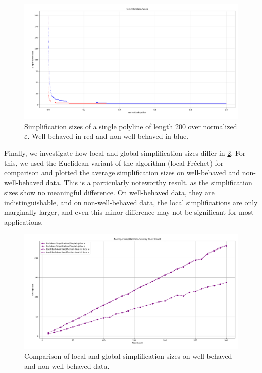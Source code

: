 \begin{figure}[b]
  \centering
	\includegraphics[scale=0.4]{./figures/vary_e200.png}
  \caption{Simplification sizes of a single polyline of length 200 over normalized \(\varepsilon\). Well-behaved in red and non-well-behaved in blue.}
  \label{fig:vary_e200}
\end{figure}

Finally, we investigate how local and global simplification sizes differ in \cref{fig:res-local-global}. For this, we used the Euclidean variant of the \citeauthor{computational_geometric_methods_for_polygonal_approximations_of_a_curve} algorithm (local Fréchet) for comparison and plotted the average simplification sizes on well-behaved and non-well-behaved data. This is a particularly noteworthy result, as the simplification sizes show no meaningful difference. On well-behaved data, they are indistinguishable, and on non-well-behaved data, the local simplifications are only marginally larger, and even this minor difference may not be significant for most applications.

\begin{figure}[b]
  \centering
	\includegraphics[scale=0.4]{./figures/res_local_global.png}
  \caption{Comparison of local and global simplification sizes on well-behaved and non-well-behaved data.}
  \label{fig:res-local-global}
\end{figure}

